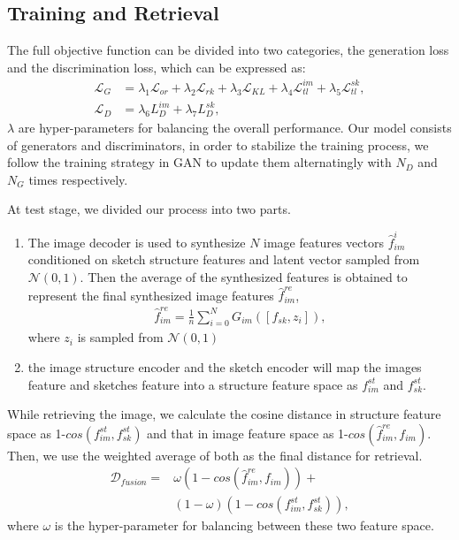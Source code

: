 \documentclass[10pt,twocolumn,letterpaper]{article}
\begin{document}
\subsection{Training and Retrieval} \label{3.3}

The full objective function can be divided into two categories, the generation loss and the discrimination loss, which can be expressed as:
\begin{align}
    \mathcal{L}_{G} \!&=\! \lambda_1 \mathcal{L}_{or} \!+\! \lambda_2 \mathcal{L}_{rk} \!+\! \lambda_3 \mathcal{L}_{KL} \!+\! \lambda_4 \mathcal{L}_{tl}^{im} \!+\! \lambda_5 \mathcal{L}_{tl}^{sk}, \\
    \mathcal{L}_{D} &= \lambda_6 L_{D}^{im} \!+\! \lambda_7 L_{D}^{sk},
\end{align}
$\lambda$ are hyper-parameters for balancing the overall performance. 
Our model consists of generators and discriminators, in order to stabilize the training process, we follow the training strategy in GAN \cite{goodfellow2014generative} to update them alternatingly with $N_{D}$ and $N_{G}$ times respectively.

At test stage, we divided our process into two parts.
\begin{enumerate}
    \item The image decoder is used to synthesize $N$ image features vectors $\hat{f}_{im}^{i}$ conditioned on sketch structure features and latent vector sampled from $\mathcal{N}(0,1)$. Then the average of the synthesized features is obtained to represent the final synthesized image features $\hat{f}_{im}^{re}$,
    \begin{align}
        \hat{f}_{im}^{re} = \frac{1}{n}\sum_{i=0}^{N}G_{im}([f_{sk}, z_i]),
    \end{align}
    where $z_i$ is sampled from $\mathcal{N}(0, 1)$
    \item the image structure encoder and the sketch encoder will map the images feature and sketches feature into a structure feature space as $f^{st}_{im}$ and $f^{st}_{sk}$.
\end{enumerate}

While retrieving the image, we calculate the cosine distance in structure feature space as 1-$cos(f^{st}_{im}, f^{st}_{sk})$ and that in image feature space as 1-$cos(\hat{f}_{im}^{re}, f_{im})$. Then, we use the weighted average of both as the final distance for retrieval.
\begin{equation}
\begin{aligned}
	\mathcal{D}_{fusion} =& \omega (1\!-\!cos(\hat{f}_{im}^{re}, f_{im})) +  \\
	& (1\!-\!\omega) (1\!-\!cos(f^{st}_{im}, f^{st}_{sk})), 
\end{aligned}
\end{equation}
where $\omega$ is the hyper-parameter for balancing between these two feature space.
\end{document}
